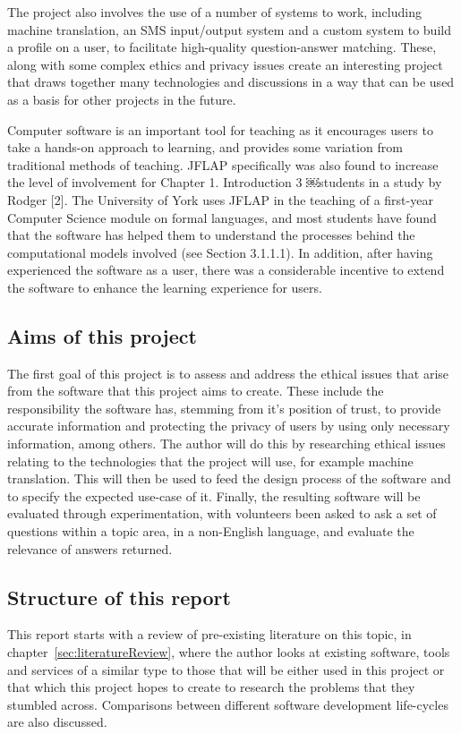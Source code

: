 \documentclass{article}
\begin{document}
The project also involves the use of a number of systems to work, including machine translation, an SMS input/output system and a custom system to build a profile on a user, to facilitate high-quality question-answer matching.  These, along with some complex ethics and privacy issues create an interesting project that draws together many technologies and discussions in a way that can be used as a basis for other projects in the future.

Computer software is an important tool for teaching as it encourages users to take a hands-on approach to learning, and provides some variation from traditional methods of teaching. JFLAP specifically was also found to increase the level of involvement for
Chapter 1. Introduction 3
￼students in a study by Rodger [2]. The University of York uses JFLAP in the teaching of a first-year Computer Science module on formal languages, and most students have found that the software has helped them to understand the processes behind the computational models involved (see Section 3.1.1.1). In addition, after having experienced the software as a user, there was a considerable incentive to extend the software to enhance the learning experience for users.

\subsection{Aims of this project}

The first goal of this project is to assess and address the ethical issues that arise from the software that this project aims to create.  These include the responsibility the software has, stemming from it's position of trust, to provide accurate information and protecting the privacy of users by using only necessary information, among others.  The author will do this by researching ethical issues relating to the technologies that the project will use, for example machine translation.  This will then be used to feed the design process of the software and to specify the expected use-case of it.  Finally, the resulting software will be evaluated through experimentation, with volunteers been asked to ask a set of questions within a topic area, in a non-English language, and evaluate the relevance of answers returned.

\subsection{Structure of this report}
This report starts with a review of pre-existing literature on this topic, in chapter~\ref{sec:literatureReview}, where the author looks at existing software, tools and services of a similar type to those that will be either used in this project or that which this project hopes to create to research the problems that they stumbled across.  Comparisons between different software development life-cycles are also discussed.
\end{document}
